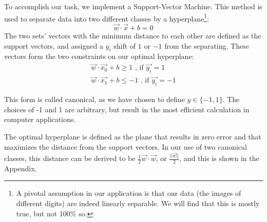 %
%

To accomplish our task, we implement a Support-Vector Machine. This method is used to separate data into two different classes by a hyperplane\footnote{A pivotal assumption in our application is that our data (the images of different digits) are indeed linearly separable. We will find that this is mostly true, but not 100\% so.}:
\begin{equation}
\vec{w}\cdot\vec{x} + b = 0
\end{equation}
The two sets' vectors with the minimum distance to each other are defined as the support vectors, and assigned a $y_{i}$ shift of $1$ or $-1$ from the separating. These vectors form the two constraints on our optimal hyperplane:
\begin{equation}
\begin{gathered}
	\vec{w}\cdot\vec{x_0} + b \geq 1 \text{ , if } \vec{y_i} = 1 \\
	\vec{w}\cdot\vec{x_1} + b \leq -1 \text{ , if } \vec{y_i} = -1 
\end{gathered}
\end{equation}

This form is called canonical, as we have chosen to define $y \in \{-1, 1\}$. The choices of -1 and 1 are arbitrary, but result in the most efficient calculation in computer applications.

The optimal hyperplane is defined as the plane that results in zero error and that maximizes the distance from the support vectors. In our use of two canonical classes, this distance can be derived to be $\frac{1}{2}\vec{w}\cdot\vec{w}$, or $\frac{||\vec{w}||}{2}$, and this is shown in the Appendix.

